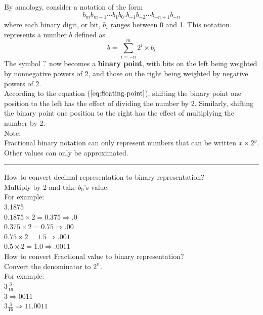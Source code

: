 \documentclass[11pt]{article}
\begin{document}
By anaology, consider a notation of the form\\
\begin{equation}
b_m b_{m-1} \cdots b_1 b_0 . b_{-1} b_{-2} \cdots b_{-n+1} b_{-n}
\end{equation}
where each binary digit, or bit, \(b_i\) ranges between 0 and 1. This notation represents a number \(b\) defined as\\
\begin{equation}
\label{eq:floating-point}
b = \sum_{i=-n}^m 2^i \times b_i
\end{equation}
The symbol '.' now becomes a \textbf{binary point}, with bits on the left being weighted by nonnegative powers of 2, and those on the right being weighted by negative powers of 2.\\


According to the equation (\(\ref{eq:floating-point}\)), shifting the binary point one position to the left has the effect of dividing the number by 2. Similarly, shifting the binary point one position to the right has the effect of multiplying the number by 2.\\

Note:\\
Fractional binary notation can only represent numbers that can be written \(x \times 2^y\). Other values can only be approximated.\\


\noindent\rule{\textwidth}{0.5pt}
How to convert decimal representation to binary representation?\\
Multiply by 2 and take \(b_0\)'s value.\\
For example:\\
3.1875\\
\(0.1875 \times 2 =  0.375  \Longrightarrow .0\)\\
\(0.375 \times 2 = 0.75 \Longrightarrow .00\)\\
\(0.75 \times 2 = 1.5 \Longrightarrow .001\)\\
\(0.5 \times 2 = 1.0 \Longrightarrow .0011\)\\

How to convert Fractional value to binary representation?\\
Convert the denominator to \(2^n\).\\
For example:\\
\(3\frac{3}{16}\) \\
\(3 \Longrightarrow 0011\)\\
\(3\frac{3}{16} \Longrightarrow 11.0011\)\\
\end{document}
